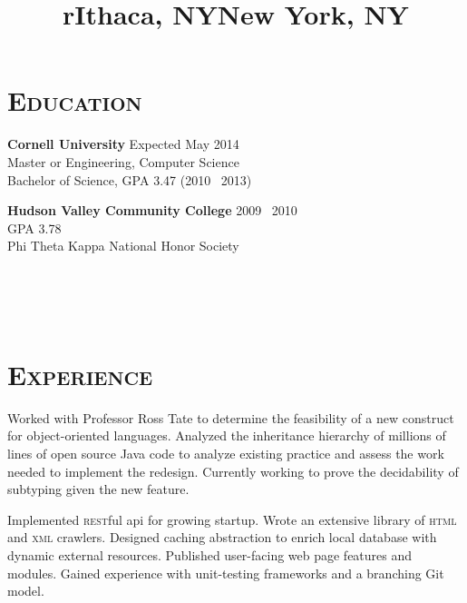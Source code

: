 \begin{resume}

\vspace{0.5cm}

\section{\textsc{Education}}

\textbf{Cornell University} \hfill Expected May 2014 \\
Master or Engineering, Computer Science\\
Bachelor of Science, GPA 3.47 (2010 \textendash\ 2013)

\textbf{Hudson Valley Community College} \hfill 2009 \textendash\ 2010 \\ 
GPA 3.78\\
Phi Theta Kappa National Honor Society\\


\begin{formatb}
  \title{r}\\
  \\
  \body\\
\end{formatb}

\vspace{0.70cm}

\section{\textsc{Experience}}

\title{Ithaca, NY}
\location{}
\begin{position}
Worked with Professor Ross Tate to determine the feasibility of a new construct for object-oriented languages.
Analyzed the inheritance hierarchy of millions of lines of open source Java code to analyze existing practice and assess the work needed to implement the redesign.
Currently working to prove the decidability of subtyping given the new feature.
\end{position}

\title{New York, NY}
\location{}
\begin{position}
Implemented \textsc{rest}ful api for growing startup.
Wrote an extensive library of \textsc{html} and \textsc{xml} crawlers.
Designed caching abstraction to enrich local database with dynamic external resources.
Published user-facing web page features and modules.
Gained experience with unit-testing frameworks and a branching Git model.
\end{position}


\end{resume}
